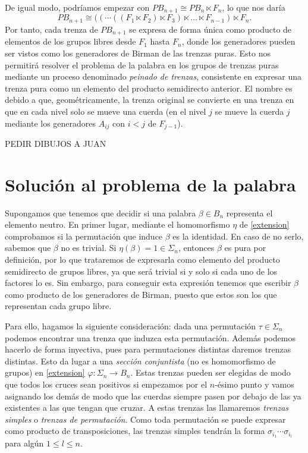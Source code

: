 \documentclass[TFG.tex]{subfiles}
\begin{document}
De igual modo, podríamos empezar con $PB_{n+1}\cong PB_n\ltimes F_n$, lo que nos daría
$$PB_{n+1}\cong ((\cdots ((F_1\ltimes F_2)\ltimes F_3)\ltimes\dots\ltimes F_{n-1})\ltimes F_n.$$
Por tanto, cada trenza de $PB_{n+1}$ se expresa de forma única como producto de elementos de los grupos libres desde $F_1$ hasta $F_n$, donde los generadores pueden ser vistos como los generadores de Birman de las trenzas puras. Esto nos permitirá resolver el problema de la palabra en los grupos de trenzas puras mediante un proceso denominado \emph{peinado de trenzas}, consistente en expresar una trenza pura como un elemento del producto semidirecto anterior. El nombre es debido a que, geométricamente, la trenza original se convierte en una trenza en que en cada nivel solo se mueve una cuerda (en el nivel $j$ se mueve la cuerda $j$ mediante los generadores $A_{ij}$ con $i<j$ de $F_{j-1}$).

PEDIR DIBUJOS A JUAN


\section{Solución al problema de la palabra}\label{simples}

Supongamos que tenemos que decidir si una palabra $\beta\in B_n$ representa el elemento neutro. En primer lugar, mediante el homomorfismo $\eta$ de \ref{extension} comprobamos si la permutación que induce $\beta$ es la identidad. En caso de no serlo, sabemos que $\beta$ no es trivial. Si $\eta(\beta)=1\in\Sigma_n$, entonces $\beta$ es pura por definición, por lo que trataremos de expresarla como elemento del producto semidirecto de grupos libres, ya que será trivial si y solo si cada uno de los factores lo es. Sin embargo, para conseguir esta expresión tenemos que escribir $\beta$ como producto de los generadores de Birman, puesto que estos son los que representan cada grupo libre.

Para ello, hagamos la siguiente consideración: dada una permutación $\tau\in\Sigma_n$ podemos encontrar una trenza que induzca esta permutación. Además podemos hacerlo de forma inyectiva, pues para permutaciones distintas daremos trenzas distintas. Esto da lugar a una \emph{sección conjuntista} (no es homomorfismo de grupos) en \ref{extension} $\varphi:\Sigma_n\to B_n$. Estas trenzas pueden ser elegidas de modo que todos los cruces sean positivos si empezamos por el $n$-ésimo punto y vamos asignando los demás de modo que las cuerdas siempre pasen por debajo de las ya existentes a las que tengan que cruzar. A estas trenzas las llamaremos \emph{trenzas simples} o \emph{trenzas de permutación}. Como toda permutación se puede expresar como producto de transposiciones, las trenzas simples tendrán la forma $\sigma_{i_1}\cdots\sigma_{i_l}$ para algún $1\leq l\leq n$. 
\end{document}
